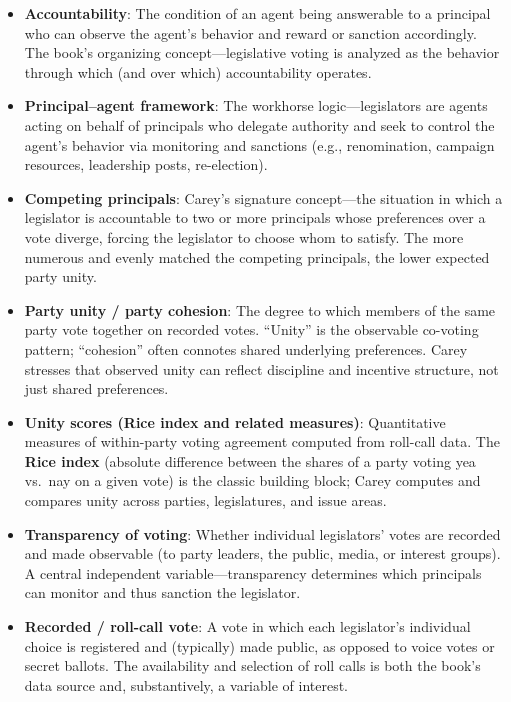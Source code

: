 \documentclass[12pt]{article}
\begin{document}
\begin{itemize}[leftmargin=*, itemsep=4pt]
    \item \textbf{Accountability}: The condition of an agent being answerable to a principal who can observe the agent's behavior and reward or sanction accordingly. The book's organizing concept---legislative voting is analyzed as the behavior through which (and over which) accountability operates.
    \item \textbf{Principal--agent framework}: The workhorse logic---legislators are agents acting on behalf of principals who delegate authority and seek to control the agent's behavior via monitoring and sanctions (e.g., renomination, campaign resources, leadership posts, re-election).
    \item \textbf{Competing principals}: Carey's signature concept---the situation in which a legislator is accountable to two or more principals whose preferences over a vote diverge, forcing the legislator to choose whom to satisfy. The more numerous and evenly matched the competing principals, the lower expected party unity.
    \item \textbf{Party unity / party cohesion}: The degree to which members of the same party vote together on recorded votes. ``Unity'' is the observable co-voting pattern; ``cohesion'' often connotes shared underlying preferences. Carey stresses that observed unity can reflect discipline and incentive structure, not just shared preferences.
    \item \textbf{Unity scores (Rice index and related measures)}: Quantitative measures of within-party voting agreement computed from roll-call data. The \textbf{Rice index} (absolute difference between the shares of a party voting yea vs.\ nay on a given vote) is the classic building block; Carey computes and compares unity across parties, legislatures, and issue areas.
    \item \textbf{Transparency of voting}: Whether individual legislators' votes are recorded and made observable (to party leaders, the public, media, or interest groups). A central independent variable---transparency determines which principals can monitor and thus sanction the legislator.
    \item \textbf{Recorded / roll-call vote}: A vote in which each legislator's individual choice is registered and (typically) made public, as opposed to voice votes or secret ballots. The availability and selection of roll calls is both the book's data source and, substantively, a variable of interest.

\end{itemize}
\end{document}
